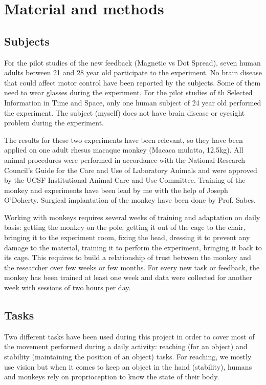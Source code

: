 \documentclass[preprint,12pt]{elsarticle}
\begin{document}
\section{Material and methods}
\subsection{Subjects}
For the pilot studies of the new feedback (Magnetic vs Dot Spread), seven human adults between 21 and 28 year old participate to the experiment. No brain disease that could affect motor control have been reported by the subjects. Some of them need to wear glasses during the experiment. For the pilot studies of th Selected Information in Time and Space, only one human subject of 24 year old performed the experiment. The subject (myself) does not have brain disease or eyesight problem during the experiment.

The results for these two experiments have been relevant, so they have been applied on one adult rhesus macaque monkey (Macaca mulatta, 12.5kg). All animal procedures were performed in accordance with the National Research Council’s Guide for the Care and Use of Laboratory Animals and were approved by the UCSF Institutional Animal Care and Use Committee. Training of the monkey and experiments have been lead by me with the help of Joseph O'Doherty. Surgical implantation of the monkey have been done by Prof. Sabes.

Working with monkeys requires several weeks of training and adaptation on daily basis: getting the monkey on the pole, getting it out of the cage to the chair, bringing it to the experiment room, fixing the head, dressing it to prevent any damage to the material, training it to perform the experiment, bringing it back to its cage. This requires to build a relationship of trust between the monkey and the researcher over few weeks or few months. For every new task or feedback, the monkey has been trained at least one week and data were collected for another week with sessions of two hours per day.

\subsection{Tasks}
Two different tasks have been used during this project in order to cover most of the movement performed during a daily activity: reaching (for an object) and stability (maintaining the position of an object) tasks. For reaching, we mostly use vision but when it comes to keep an object in the hand (stability), humans and monkeys rely on proprioception to know the state of their body.
\end{document}
